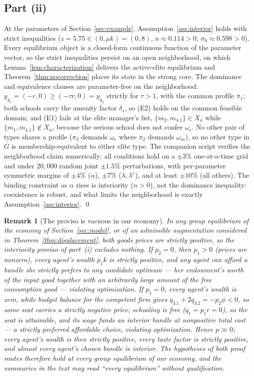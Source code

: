 \documentclass[12pt,letterpaper]{article}
\newtheorem{remark}{Remark}
\theoremstyle{definition}
\begin{document}
\subsection{Part (ii)}
At the parameters of Section~\ref{sec:example}, Assumption~\ref{ass:interior} holds with strict inequalities ($z=5.75\in(0,\mu k)=(0,8)$, $n\approx 0.114>0$, $\sigma_0\approx 0.598>0$).
Every equilibrium object is a closed-form continuous function of the parameter vector, so the strict inequalities persist on an open neighborhood, on which Lemma~\ref{lem:characterization} delivers the active-elite equilibrium and Theorem~\ref{thm:nocorrection} places its state in the strong core.
The dominance and equivalence clauses are parameter-free on the neighborhood: $y_{g_1}=(-r,0)\geq(-\tau r,0)=y_{g_2}$ strictly for $\tau>1$, with the common profile $\pi_1$; both schools carry the amenity factor $\delta_s$, so (E2) holds on the common feasible domain; and (E1) fails at the elite manager's list, $\{m_2,m_{4.1}\}\in X_a$ while $\{m_1,m_{4.1}\}\notin X_a$, because the serious school does not confer $\omega_e$.
No other pair of types shares a profile ($\pi_3$ demands $\omega_e$ where $\pi_2$ demands $\omega_m$), so no other type in $G$ is membership-equivalent to either elite type.
The companion script verifies the neighborhood claim numerically: all conditions hold on a $\pm 3\%$ one-at-a-time grid and under $20{,}000$ random joint $\pm 1.5\%$ perturbations, with per-parameter symmetric margins of $\pm 4\%$ ($\alpha$), $\pm 7\%$ ($\lambda,\lambda^{e}$), and at least $\pm 10\%$ (all others).
The binding constraint as $\alpha$ rises is interiority ($n>0$), not the dominance inequality: coexistence is robust, and what limits the neighborhood is exactly Assumption~\ref{ass:interior}.
\qed

\begin{remark}[The proviso is vacuous in our economy]\label{rem:proviso}
In any group equilibrium of the economy of Section~\ref{sec:model}, or of an admissible augmentation considered in Theorem~\ref{thm:displacement}, both goods prices are strictly positive, so the interiority proviso of part~(i) excludes nothing.
If $p_2=0$, then $p_1>0$ (prices are nonzero), every agent's wealth $p_1k$ is strictly positive, and any agent can afford a bundle she strictly prefers to any candidate optimum --- her endowment's worth of the input good together with an arbitrarily large amount of the free consumption good --- violating optimization.
If $p_1=0$, every agent's wealth is zero, while budget balance for the competent firm gives $q_{3.1}+2q_{3.2}=-p_2\phi<0$, so some seat carries a strictly negative price; schooling is free ($q_1=p_1r=0$), so the seat is attainable, and its wage funds an interior bundle at nonpositive total cost --- a strictly preferred affordable choice, violating optimization.
Hence $p\gg 0$; every agent's wealth is then strictly positive, every taste factor is strictly positive, and almost every agent's chosen bundle is interior.
The hypotheses of both proof routes therefore hold at every group equilibrium of our economy, and the summaries in the text may read ``every equilibrium'' without qualification.
\end{remark}
\end{document}
